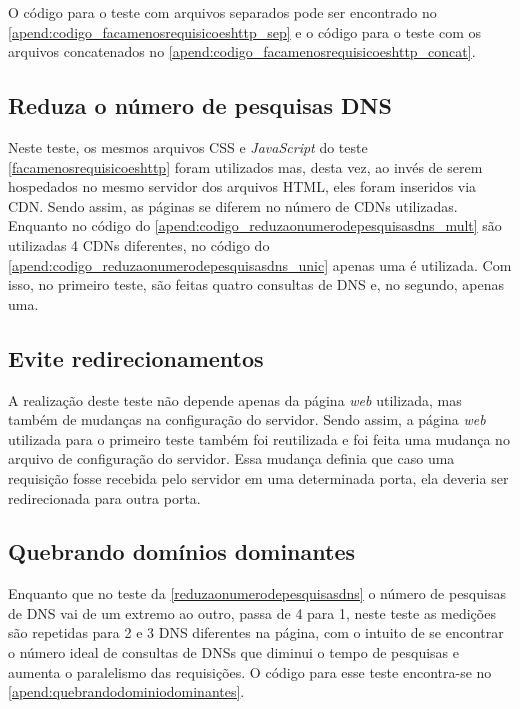 O código para o teste com arquivos separados pode ser encontrado no \autoref{apend:codigo_facamenosrequisicoeshttp_sep} e o código para o teste com os arquivos concatenados no \autoref{apend:codigo_facamenosrequisicoeshttp_concat}.

\subsection{Reduza o número de pesquisas DNS}
\label{reduzaonumerodepesquisasdns}

Neste teste, os mesmos arquivos CSS e \textit{JavaScript} do teste \ref{facamenosrequisicoeshttp} foram utilizados mas, desta vez, ao invés de serem hospedados no mesmo servidor dos arquivos HTML, eles foram inseridos via CDN. Sendo assim, as páginas se diferem no número de CDNs utilizadas. Enquanto no código do \autoref{apend:codigo_reduzaonumerodepesquisasdns_mult} são utilizadas 4 CDNs diferentes, no código do \autoref{apend:codigo_reduzaonumerodepesquisasdns_unic} apenas uma é utilizada. Com isso, no primeiro teste, são feitas quatro consultas de DNS e, no segundo, apenas uma.

\subsection{Evite redirecionamentos}
\label{eviteredirecionamentos}

A realização deste teste não depende apenas da página \textit{web} utilizada, mas também de mudanças na configuração do servidor. Sendo assim, a página \textit{web} utilizada para o primeiro teste também foi reutilizada e foi feita uma mudança no arquivo de configuração do servidor. Essa mudança definia que caso uma requisição fosse recebida pelo servidor em uma determinada porta, ela deveria ser redirecionada para outra porta.

\subsection{Quebrando domínios dominantes}
\label{quebrandodominiosdominantes}

Enquanto que no teste da \autoref{reduzaonumerodepesquisasdns} o número de pesquisas de DNS vai de um extremo ao outro, passa de 4 para 1, neste teste as medições são repetidas para 2 e 3 DNS diferentes na página, com o intuito de se encontrar o número ideal de consultas de DNSs que diminui o tempo de pesquisas e aumenta o paralelismo das requisições. O código para esse teste encontra-se no \autoref{apend:quebrandodominiodominantes}.

